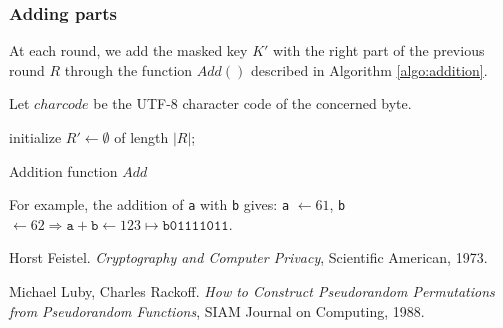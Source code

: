 \documentclass[twoside,twocolumn]{article}
\theoremstyle{definition}
\theoremstyle{remark}
\begin{document}
\subsubsection{Adding parts}

At each round, we add the masked key $K'$ with the right part of the previous round $R$ through the function $Add()$ described in Algorithm 
\ref{algo:addition}.

Let $charcode$ be the UTF-8 character code of the concerned byte.
\begin{algorithm}
    initialize $R' \gets \emptyset$ of length $|R|$; \\
    \caption{Addition function $Add$}
    \label{algo:addition}
\end{algorithm}

For example, the addition of \texttt{a} with \texttt{b} gives:
\texttt{a} $\gets 61$,  \texttt{b} $\gets 62 \Rightarrow \texttt{a} + \texttt{b} \gets 123 \mapsto \texttt{b01111011}$.

\tableofcontents %


\begin{thebibliography}{99} %

Horst Feistel. \emph{Cryptography and Computer Privacy}, Scientific American, 1973.

Michael Luby, Charles Rackoff. \emph{How to Construct Pseudorandom Permutations from Pseudorandom Functions}, SIAM Journal on Computing, 1988.

\end{thebibliography}

\end{document}

